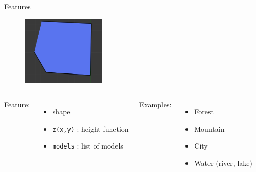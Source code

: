 \documentclass{beamer}
\begin{document}
\begin{frame}{Features}
  \begin{figure}
    \begin{center}
      \includegraphics[width=4cm]{feature}
    \end{center}
  \end{figure}

  \begin{columns}[t]
    Feature:
    \begin{itemize}
      \item {\color{Cerulean}shape}
      \item \texttt{z(x,y)} : height function
      \item \texttt{models} : list of models
    \end{itemize}

    \pause
    Examples:
    \begin{itemize}
      \item Forest
      \item Mountain
      \item City
      \item Water (river, lake)
    \end{itemize}
  \end{columns}
\end{frame}
\end{document}
